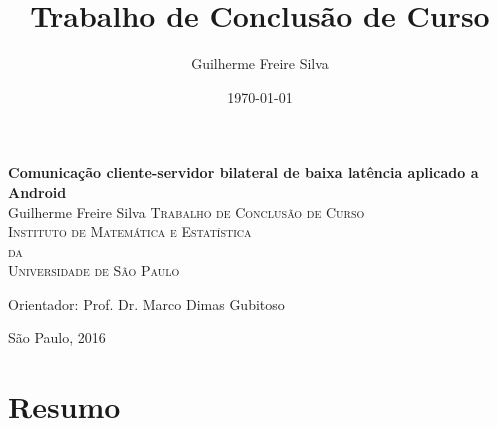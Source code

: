\documentclass[a4paper,12pt]{article}
\title{Trabalho de Conclusão de Curso}
\author{Guilherme Freire Silva}
\date{\today}
\begin{document}

\thispagestyle{empty}
\begin{center}
    \vspace*{2.3cm}
    \textbf{\Large{Comunicação cliente-servidor bilateral de baixa latência aplicado a Android}}\\


    \vspace*{1.2cm}
    \Large{
        Guilherme Freire Silva
    }
    \vskip 2cm
    \textsc{
     Trabalho de Conclusão de Curso \\[-0.25cm]
    Instituto de Matemática e Estatística\\[-0.25cm]
    da\\[-0.25cm]
    Universidade de São Paulo\\[-0.25cm]%
    }

    \vskip 2.5cm
    Orientador: Prof. Dr. Marco Dimas Gubitoso

    \vskip 3.5cm
    \normalsize{São Paulo, 2016}
\end{center}

\newpage
% 

\newpage
\listoffigures
\listoftables
\tableofcontents

% 

\newpage %

\renewcommand{\arraystretch}{1.2}

% 
% 
% 
% 
% 
% 
% 
% 


\newpage
\section{Resumo}
\end{document}
